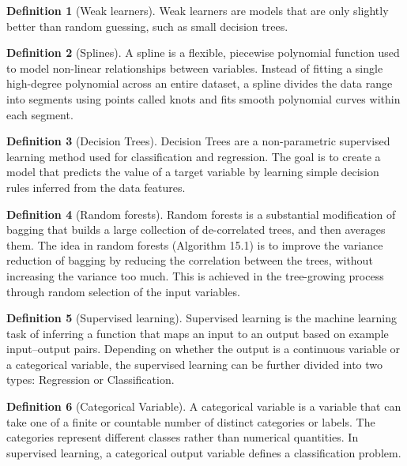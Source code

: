 \documentclass{article}
\theoremstyle{definition}
\newtheorem{definition}{Definition}
\theoremstyle{Solution}
\begin{document}
\begin{definition}[Weak learners]
Weak learners are models that are only slightly better than random guessing, such as small decision trees.
\end{definition}

\begin{definition}[Splines]
A spline is a flexible, piecewise polynomial function used to model non-linear relationships between variables. Instead of fitting a single high-degree polynomial across an entire dataset, a spline divides the data range into segments using points called knots and fits smooth polynomial curves within each segment.
\end{definition}

\begin{definition}[Decision Trees]
Decision Trees are a non-parametric supervised learning method used for classification and regression. The goal is to create a model that predicts the value of a target variable by learning simple decision rules inferred from the data features.
\end{definition}

\begin{definition}[Random forests]
Random forests is a substantial modification of bagging that builds a large collection of de-correlated trees, and then averages them. The idea in random forests (Algorithm 15.1) is to improve the variance reduction of bagging by reducing the correlation between the trees, without increasing the variance too much. This is achieved in the tree-growing process through random selection of the input variables.
\end{definition}

\begin{definition}[Supervised learning]
Supervised learning is the machine learning task of inferring a function that maps an input to an output based on example input–output pairs. Depending on whether the output is a continuous variable or a categorical variable, the supervised learning can be further divided into two types: Regression or Classification.
\end{definition}

\begin{definition}[Categorical Variable]
A categorical variable is a variable that can take one of a finite or countable number of distinct categories or labels. The categories represent different classes rather than numerical quantities. In supervised learning, a categorical output variable defines a classification problem.
\end{definition}
\end{document}
